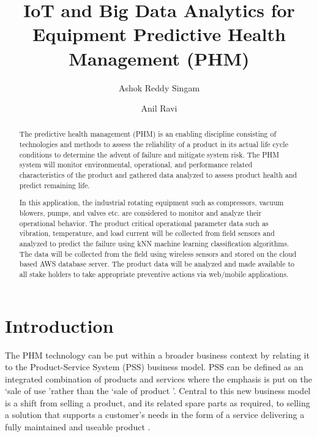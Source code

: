 \documentclass[sigconf]{acmart}
\begin{document}
\title{IoT and Big Data Analytics for Equipment Predictive Health Management (PHM)}
\author{Ashok Reddy Singam}
\author{Anil Ravi}
\begin{abstract}
The predictive health management (PHM) is an enabling discipline consisting of technologies and methods to assess the reliability of a product in its actual life cycle conditions to determine the advent of failure and mitigate system risk. The PHM system will monitor environmental, operational, and performance related characteristics of the product and gathered data analyzed to assess product health and predict remaining life. 

In this application, the industrial rotating equipment such as compressors, vacuum blowers, pumps, and valves etc. are considered to monitor and analyze their operational behavior. The product critical operational parameter data such as vibration, temperature, and load current will be collected from field sensors and analyzed to predict the failure using kNN machine learning classification algorithms. The data will be collected from the field using wireless sensors and stored on the cloud based AWS database server. The product data will be analyzed and made available to all stake holders to take appropriate preventive actions via web/mobile applications.
\end{abstract}
\maketitle
\section{Introduction}
The PHM technology can be put within a broader business context by relating it to the Product-Service System (PSS) business model. PSS can be defined as an integrated combination of products and services where the emphasis is put on the \lq sale of use \rq rather than the \lq sale of product \rq. Central to this new business model is a shift from selling a product, and its related spare parts as required, to selling a solution that supports a customer’s needs in the form of a service delivering a fully maintained and useable product \cite{Tonci2009}.
\end{document}
